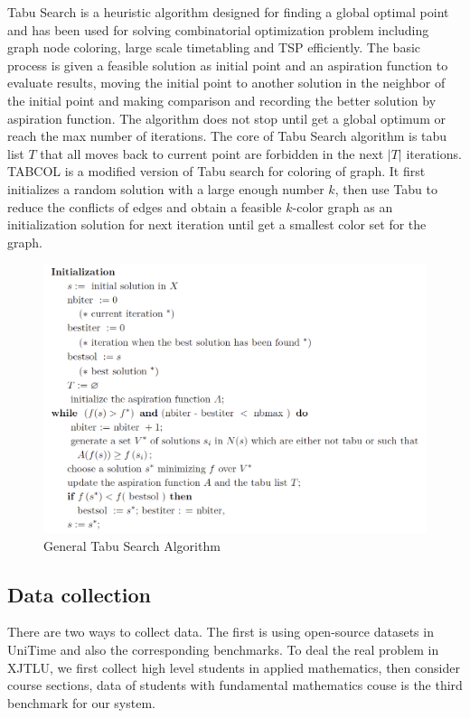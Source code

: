 \documentclass{article}
\begin{document}
Tabu Search is a heuristic algorithm designed for finding a global optimal point and has been used for solving combinatorial optimization problem including graph node coloring, large scale timetabling and TSP efficiently. The basic process is given a feasible solution as initial point and an aspiration function to evaluate results, moving the initial point to another solution in the neighbor of the initial point and making comparison and recording the better solution by aspiration function. The algorithm does not stop until get a global optimum or reach the max number of iterations. The core of Tabu Search algorithm is tabu list $T$ that all moves back to current point are forbidden in the next $|T|$ iterations. TABCOL\citep{(hertz1987)using} is a modified version of Tabu search for coloring of graph. It first initializes a random solution with a large enough number $k$, then use Tabu to reduce the conflicts of edges and obtain a feasible $k$-color graph as an initialization solution for next iteration until get a smallest color set for the graph.


\begin{figure}[h]
	\centering
	\includegraphics[width=0.8\linewidth]{fig3.png}
	\caption{General Tabu Search Algorithm \citep{(hertz1991)tabu}}
\end{figure}

\subsection{Data collection}

There are two ways to collect data. The first is using open-source datasets in UniTime and also the corresponding benchmarks. To deal the real problem in XJTLU, we first collect high level students in applied mathematics, then consider course sections, data of students with fundamental mathematics couse is the third benchmark for our system. 
\end{document}
